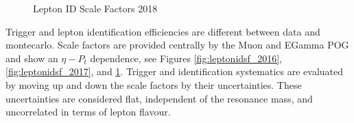 \begin{figure}[tph]
  \centering
  \vfil
  \caption{Lepton ID Scale Factors 2018}
  \label{fig:leptonidsf_2018}
\end{figure}

Trigger and lepton identification efficiencies are different between data
and montecarlo. Scale factors are provided centrally by the Muon and EGamma POG
and show an $\eta-P_{t}$ dependence, see Figures \ref{fig:leptonidsf_2016},
\ref{fig:leptonidsf_2017}, and \ref{fig:leptonidsf_2018}. Trigger and
identification systematics are evaluated by moving up and down the scale factors
by their uncertainties. These uncertainties are considered flat, independent
of the resonance mass, and uncorrelated in terms of lepton flavour.

